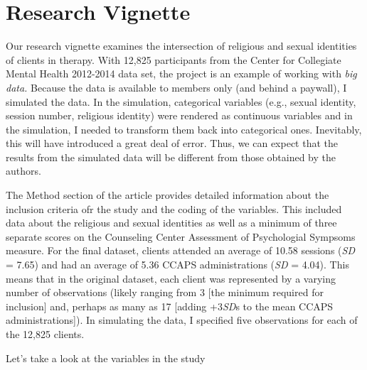 \documentclass[
  11pt,
]{book}
\begin{document}
\hypertarget{research-vignette-3}{%
\section{Research Vignette}\label{research-vignette-3}}

Our research vignette \citep{lefevor_religious_2017} examines the intersection of religious and sexual identities of clients in therapy. With 12,825 participants from the Center for Collegiate Mental Health 2012-2014 data set, the project is an example of working with \emph{big data.} Because the data is available to members only (and behind a paywall), I simulated the data. In the simulation, categorical variables (e.g., sexual identity, session number, religious identity) were rendered as continuous variables and in the simulation, I needed to transform them back into categorical ones. Inevitably, this will have introduced a great deal of error. Thus, we can expect that the results from the simulated data will be different from those obtained by the authors.

The Method section of the article provides detailed information about the inclusion criteria ofr the study and the coding of the variables. This included data about the religious and sexual identities as well as a minimum of three separate scores on the Counseling Center Assessment of Psychologial Sympsoms \citep[CCAPS,][]{locke_development_2012} measure. For the final dataset, clients attended an average of 10.58 sessions (\emph{SD} = 7.65) and had an average of 5.36 CCAPS administrations (\emph{SD} = 4.04). This means that in the original dataset, each client was represented by a varying number of observations (likely ranging from 3 {[}the minimum required for inclusion{]} and, perhaps as many as 17 {[}adding +3\emph{SD}s to the mean CCAPS administrations{]}). In simulating the data, I specified five observations for each of the 12,825 clients.

Let's take a look at the variables in the study
\end{document}
